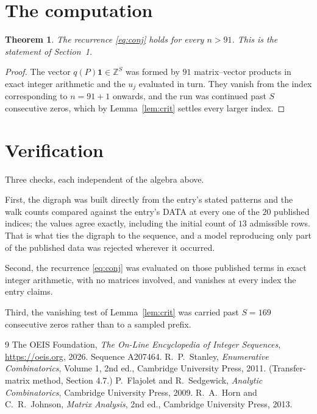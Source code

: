 \documentclass[11pt,a4paper]{article}
\theoremstyle{plain}
\newtheorem{theorem}{Theorem}
\theoremstyle{definition}
\begin{document}
\section{The computation}

\begin{theorem}
The recurrence \eqref{eq:conj} holds for every $n>91$. This is the statement of
Section~1.
\end{theorem}

\begin{proof}
The vector $q(P)\mathbf{1}\in\mathbb{Z}^{S}$ was formed by $91$ matrix--vector
products in exact integer arithmetic and the $u_j$ evaluated in turn. They vanish from the
index corresponding to $n=91+1$ onwards, and the run was continued past $S$ consecutive
zeros, which by Lemma~\ref{lem:crit} settles every larger index.
\end{proof}

\section{Verification}

Three checks, each independent of the algebra above.

First, the digraph was built directly from the entry's stated patterns and the walk counts
compared against the entry's DATA at every one of the $20$ published indices; the
values agree exactly, including the initial count of $13$ admissible rows. That is
what ties the digraph to the sequence, and a model reproducing only part of the published
data was rejected wherever it occurred.

Second, the recurrence \eqref{eq:conj} was evaluated on those published terms in exact
integer arithmetic, with no matrices involved, and vanishes at every index the entry claims.

Third, the vanishing test of Lemma~\ref{lem:crit} was carried past $S=169$ consecutive
zeros rather than to a sampled prefix.

\begin{thebibliography}{9}
 The OEIS Foundation, \emph{The On-Line Encyclopedia of Integer
Sequences}, \url{https://oeis.org}, 2026. Sequence A207464.
 R.~P.~Stanley, \emph{Enumerative Combinatorics}, Volume 1, 2nd ed.,
Cambridge University Press, 2011. (Transfer-matrix method, Section 4.7.)
 P.~Flajolet and R.~Sedgewick, \emph{Analytic Combinatorics}, Cambridge
University Press, 2009.
 R.~A.~Horn and C.~R.~Johnson, \emph{Matrix Analysis}, 2nd ed., Cambridge
University Press, 2013.
\end{thebibliography}
\end{document}
